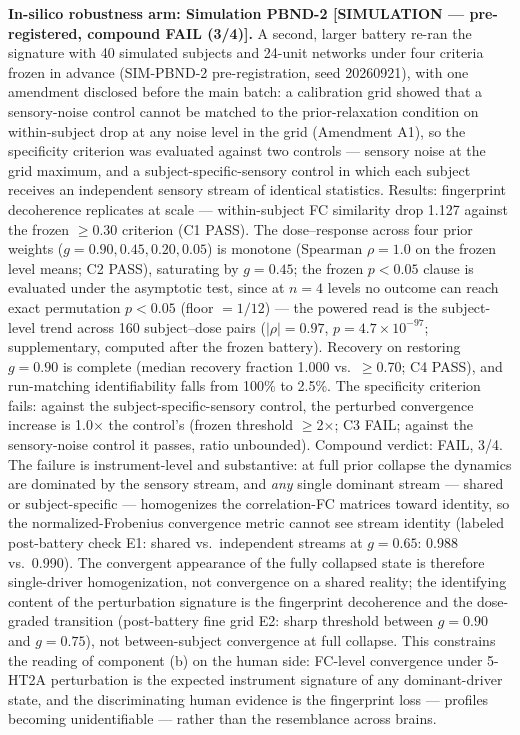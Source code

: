 \documentclass[
]{article}
\begin{document}
\textbf{In-silico robustness arm: Simulation PBND-2 {[}SIMULATION ---
pre-registered, compound FAIL (3/4){]}.} A second, larger battery re-ran
the signature with 40 simulated subjects and 24-unit networks under four
criteria frozen in advance (SIM-PBND-2 pre-registration, seed 20260921),
with one amendment disclosed before the main batch: a calibration grid
showed that a sensory-noise control cannot be matched to the
prior-relaxation condition on within-subject drop at any noise level in
the grid (Amendment A1), so the specificity criterion was evaluated
against two controls --- sensory noise at the grid maximum, and a
subject-specific-sensory control in which each subject receives an
independent sensory stream of identical statistics. Results: fingerprint
decoherence replicates at scale --- within-subject FC similarity drop
1.127 against the frozen \(\geq\)0.30 criterion (C1 PASS). The
dose--response across four prior weights
(\(g = 0.90, 0.45, 0.20, 0.05\)) is monotone (Spearman \(\rho = 1.0\) on
the frozen level means; C2 PASS), saturating by \(g = 0.45\); the frozen
\(p<0.05\) clause is evaluated under the asymptotic test, since at
\(n = 4\) levels no outcome can reach exact permutation \(p < 0.05\)
(floor \(= 1/12\)) --- the powered read is the subject-level trend
across 160 subject--dose pairs (\(|\rho| = 0.97\),
\(p = 4.7\times10^{-97}\); supplementary, computed after the frozen
battery). Recovery on restoring \(g = 0.90\) is complete (median
recovery fraction 1.000 vs.~\(\geq\)0.70; C4 PASS), and run-matching
identifiability falls from 100\% to 2.5\%. The specificity criterion
fails: against the subject-specific-sensory control, the perturbed
convergence increase is 1.0\(\times\) the control's (frozen threshold
\(\geq\)2\(\times\); C3 FAIL; against the sensory-noise control it
passes, ratio unbounded). Compound verdict: FAIL, 3/4. The failure is
instrument-level and substantive: at full prior collapse the dynamics
are dominated by the sensory stream, and \emph{any} single dominant
stream --- shared or subject-specific --- homogenizes the correlation-FC
matrices toward identity, so the normalized-Frobenius convergence metric
cannot see stream identity (labeled post-battery check E1: shared
vs.~independent streams at \(g = 0.65\): 0.988 vs.~0.990). The
convergent appearance of the fully collapsed state is therefore
single-driver homogenization, not convergence on a shared reality; the
identifying content of the perturbation signature is the fingerprint
decoherence and the dose-graded transition (post-battery fine grid E2:
sharp threshold between \(g = 0.90\) and \(g = 0.75\)), not
between-subject convergence at full collapse. This constrains the
reading of component (b) on the human side: FC-level convergence under
5-HT2A perturbation is the expected instrument signature of any
dominant-driver state, and the discriminating human evidence is the
fingerprint loss --- profiles becoming unidentifiable --- rather than
the resemblance across brains.
\end{document}
